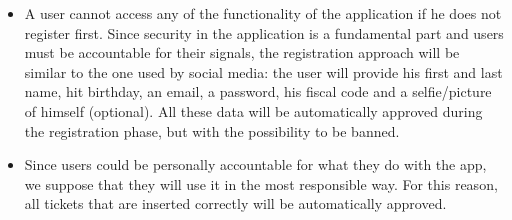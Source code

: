 \begin{itemize}
    \item A user cannot access any of the functionality of the application if he does not register first.
        Since security in the application is a fundamental part and users must be accountable for their signals,
        the registration approach will be similar to the one used by social media: the user will provide his first and last name, hit birthday, an email, a password, his fiscal code and a selfie/picture of himself (optional).
        All these data will be automatically approved during the registration phase, but with the possibility to be banned.
    \item Since users could be personally accountable for what they do with the app, we suppose that they will use it
        in the most responsible way. For this reason, all tickets that are inserted correctly will be automatically approved.
\end{itemize}
